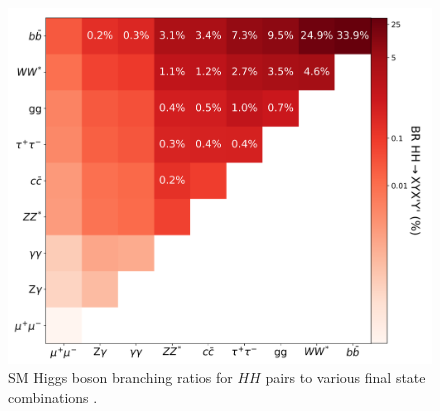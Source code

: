 \begin{figure}[!htp]
    \centering
    \includegraphics[width=.75\textwidth]{chapters/chapter1_theory/images/hh-brs.png}
    \caption[\gls{SM} Higgs boson branching ratios for $HH$ pairs to various final state combinations]{\gls{SM} Higgs boson branching ratios for $HH$ pairs to various final state combinations \cite{hh-whitepaper}.}
    \label{fig:hh-brs}
\end{figure}